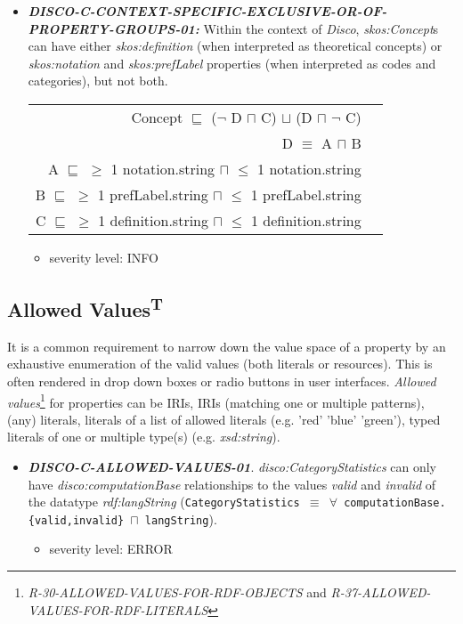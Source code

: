\documentclass{llncs}
\newcommand{\ms}[1]{\texttt{#1}}
\newenvironment{DL}{
  \vspace{0cm}
  \begin{tabular}{r l}

}{
  \end{tabular}
}
\begin{document}
\begin{itemize}
	\item \textbf{{\em DISCO-C-CONTEXT-SPECIFIC-EXCLUSIVE-OR-OF-PROPERTY-GROUPS-01:}}
Within the context of \emph{Disco}, \emph{skos:Concept}s can have either \emph{skos:definition} (when interpreted as theoretical concepts) or \emph{skos:notation} and \emph{skos:prefLabel} properties (when interpreted as codes and categories), but not both.
\begin{DL}
Concept $\sqsubseteq$ ($\neg$ D $\sqcap$ C) $\sqcup$ (D $\sqcap$ $\neg$ C) \\ 
D $\equiv$ A $\sqcap$ B \\
A $\sqsubseteq$ $\geq$ 1 notation.string $\sqcap$ $\leq$ 1 notation.string \\
B $\sqsubseteq$ $\geq$ 1 prefLabel.string $\sqcap$ $\leq$ 1 prefLabel.string \\
C $\sqsubseteq$ $\geq$ 1 definition.string $\sqcap$ $\leq$ 1 definition.string \\
\end{DL}
\begin{itemize}
		\item severity level: INFO
	\end{itemize}
\end{itemize}

\subsection{Allowed Values\textsuperscript{T}}

It is a common requirement to narrow down the value space of a property by an exhaustive enumeration of the valid values (both literals or resources). 
This is often rendered in drop down boxes or radio buttons in user interfaces. 
\emph{Allowed values}\footnote{{\em R-30-ALLOWED-VALUES-FOR-RDF-OBJECTS} and 
{\em R-37-ALLOWED-VALUES-FOR-RDF-LITERALS}} for properties can be IRIs, IRIs (matching one or multiple patterns), (any) literals, literals of a list of allowed literals (e.g. 'red' 'blue' 'green'), typed literals of one or multiple type(s) (e.g. \emph{xsd:string}).

\begin{itemize}
	\item \textbf{{\em DISCO-C-ALLOWED-VALUES-01}}.
{\em disco:CategoryStatistics} can only have {\em disco:computationBase} relationships to the values \emph{valid} and \emph{invalid} of the datatype {\em rdf:langString} (\ms{CategoryStatistics $\equiv$ $\forall$ computationBase.\{valid,invalid\} $\sqcap$ langString}).
	\begin{itemize}
		\item severity level: ERROR
	\end{itemize}
\end{itemize}
\end{document}
